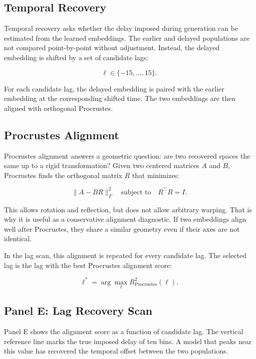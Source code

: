 \documentclass[11pt]{article}
\begin{document}
\subsection{Temporal Recovery}

Temporal recovery asks whether the delay imposed during generation can be
estimated from the learned embeddings. The earlier and delayed populations are
not compared point-by-point without adjustment. Instead, the delayed embedding
is shifted by a set of candidate lags:

\begin{equation}
\ell \in \{-15,\ldots,15\}.
\end{equation}

For each candidate lag, the delayed embedding is paired with the earlier
embedding at the corresponding shifted time. The two embeddings are then
aligned with orthogonal Procrustes.

\subsection{Procrustes Alignment}

Procrustes alignment answers a geometric question: are two recovered spaces
the same up to a rigid transformation? Given two centered matrices $A$ and
$B$, Procrustes finds the orthogonal matrix $R$ that minimizes:

\begin{equation}
\|A - BR\|_F^2
\quad
\text{subject to}
\quad
R^\top R = I.
\end{equation}

This allows rotation and reflection, but does not allow arbitrary warping.
That is why it is useful as a conservative alignment diagnostic. If two
embeddings align well after Procrustes, they share a similar geometry even if
their axes are not identical.

In the lag scan, this alignment is repeated for every candidate lag. The
selected lag is the lag with the best Procrustes alignment score:

\begin{equation}
\ell^\ast
=
\arg\max_{\ell}
R^2_{\text{Procrustes}}(\ell).
\end{equation}

\subsection{Panel E: Lag Recovery Scan}

Panel E shows the alignment score as a function of candidate lag. The vertical
reference line marks the true imposed delay of ten bins. A model that peaks
near this value has recovered the temporal offset between the two populations.
\end{document}
